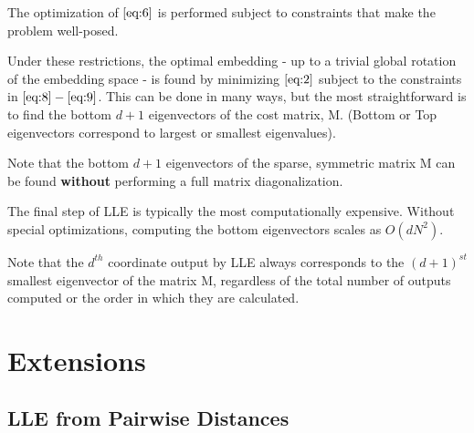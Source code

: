 \documentclass[11pt]{article}
\begin{document}
The optimization of \(\eqref{eq:6}\) is performed subject to constraints that make
the problem well-posed.

Under these restrictions, the optimal embedding - up to a trivial global
rotation of the embedding space - is found by minimizing \(\eqref{eq:2}\) subject
to the constraints in \(\eqref{eq:8}-\eqref{eq:9}\). This can be done in many
ways, but the most straightforward is to find the bottom \(d + 1\) eigenvectors of
the cost matrix, M. (Bottom or Top eigenvectors correspond to largest or
smallest eigenvalues).

Note that the bottom \(d + 1\) eigenvectors of the sparse, symmetric matrix M can
be found \textbf{without} performing a full matrix diagonalization.

The final step of LLE is typically the most computationally expensive. Without
special optimizations, computing the bottom eigenvectors scales as \(O(dN^2)\).

Note that the \(d^{th}\) coordinate output by LLE always corresponds to the \((d +
1)^{st}\) smallest eigenvector of the matrix M, regardless of the total number
of outputs computed or the order in which they are calculated.

\section{Extensions}
\label{sec:org519ff88}
\subsection{LLE from Pairwise Distances}
\label{sec:org8fb6264}
\end{document}
